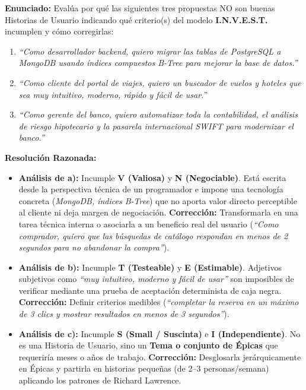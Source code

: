 \begin{ejercicio}
\textbf{Enunciado:} Evalúa por qué las siguientes tres propuestas NO son buenas Historias de Usuario indicando qué criterio(s) del modelo \textbf{I.N.V.E.S.T.} incumplen y cómo corregirlas:
\begin{enumerate}[label=\textbf{\alph*)}]
    \item \textit{``Como desarrollador backend, quiero migrar las tablas de PostgreSQL a MongoDB usando índices compuestos B-Tree para mejorar la base de datos.''}
    \item \textit{``Como cliente del portal de viajes, quiero un buscador de vuelos y hoteles que sea muy intuitivo, moderno, rápido y fácil de usar.''}
    \item \textit{``Como gerente del banco, quiero automatizar toda la contabilidad, el análisis de riesgo hipotecario y la pasarela internacional SWIFT para modernizar el banco.''}
\end{enumerate}

\textbf{Resolución Razonada:}
\begin{itemize}[itemsep=3pt]
    \item \textbf{Análisis de a):} Incumple \textbf{V (Valiosa)} y \textbf{N (Negociable)}. Está escrita desde la perspectiva técnica de un programador e impone una tecnología concreta (\textit{MongoDB, índices B-Tree}) que no aporta valor directo perceptible al cliente ni deja margen de negociación. \textbf{Corrección:} Transformarla en una tarea técnica interna o asociarla a un beneficio real del usuario (\textit{``Como comprador, quiero que las búsquedas de catálogo respondan en menos de 2 segundos para no abandonar la compra''}).
    \item \textbf{Análisis de b):} Incumple \textbf{T (Testeable)} y \textbf{E (Estimable)}. Adjetivos subjetivos como \textit{``muy intuitivo, moderno y fácil de usar''} son imposibles de verificar mediante una prueba de aceptación determinista de caja negra. \textbf{Corrección:} Definir criterios medibles (\textit{``completar la reserva en un máximo de 3 clics y mostrar resultados en menos de 3 segundos''}).
    \item \textbf{Análisis de c):} Incumple \textbf{S (Small / Suscinta)} e \textbf{I (Independiente)}. No es una Historia de Usuario, sino un \textbf{Tema o conjunto de Épicas} que requeriría meses o años de trabajo. \textbf{Corrección:} Desglosarla jerárquicamente en Épicas y partirla en historias pequeñas (de 2--3 personas/semana) aplicando los patrones de Richard Lawrence.
\end{itemize}
\end{ejercicio}

